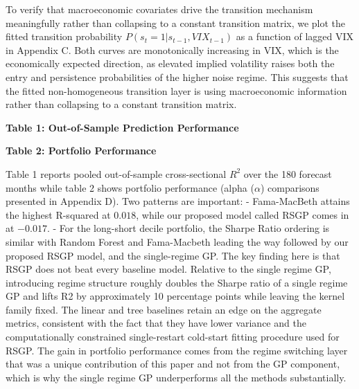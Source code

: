\documentclass[11pt]{article}
\begin{document}
To verify that macroeconomic covariates drive the transition mechanism meaningfully rather than collapsing to a constant transition matrix, we plot the fitted transition probability $P(s_t = 1|s_{t-1}, VIX_{t-1})$ as a function of lagged VIX in Appendix C. Both curves are monotonically increasing in VIX, which is the economically expected direction, as elevated implied volatility raises both the entry and persistence probabilities of the higher noise regime. This suggests that the fitted non-homogeneous transition layer is using macroeconomic information rather than collapsing to a constant transition matrix.  

\begin{table}[H]
\centering
\begin{minipage}[t]{0.43\textwidth}
\centering
\small
\textbf{Table 1: Out-of-Sample Prediction Performance}\\[4pt]
\resizebox{\linewidth}{!}{}
\end{minipage}
\hfill
\begin{minipage}[t]{0.55\textwidth}
\centering
\small
\textbf{Table 2: Portfolio Performance}\\[4pt]
\resizebox{\linewidth}{!}{}
\end{minipage}
\label{tab:results-table-1-and-2}
\end{table}

Table 1 reports pooled out-of-sample cross-sectional $R^2$ over the 180 forecast months while table 2 shows portfolio performance (alpha ($\alpha$) comparisons presented in Appendix D). Two patterns are important:
- Fama-MacBeth attains the highest R-squared at $0.018$, while our proposed model called RSGP comes in at $-0.017$. 
- For the long-short decile portfolio, the Sharpe Ratio ordering is similar with Random Forest and Fama-Macbeth leading the way followed by our proposed RSGP model, and the single-regime GP. 
The key finding here is that RSGP does not beat every baseline model. Relative to the single regime GP, introducing regime structure roughly doubles the Sharpe ratio of a single regime GP and lifts R2 by approximately 10 percentage points while leaving the kernel family fixed. The linear and tree baselines retain an edge on the aggregate metrics, consistent with the fact that they have lower variance and the computationally constrained single-restart cold-start fitting procedure used for RSGP. The gain in portfolio performance comes from the regime switching layer that was a unique contribution of this paper and not from the GP component, which is why the single regime GP underperforms all the methods substantially. 
\end{document}
